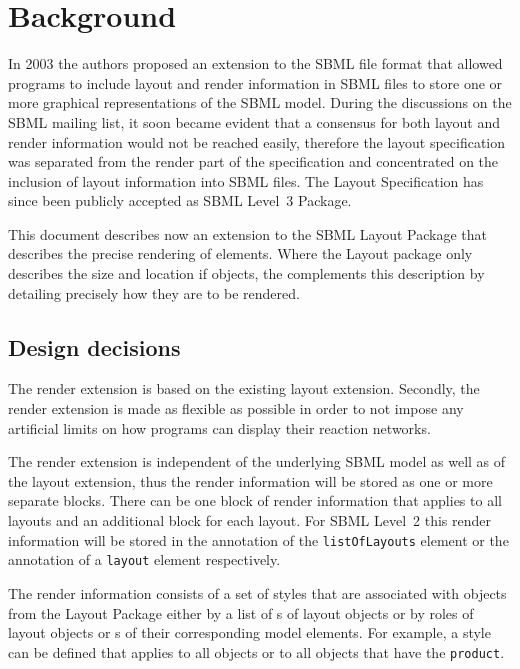 
\section{Background}
\label{background}

In 2003 the authors proposed an extension to the SBML file format that allowed programs 
to include layout and render information in SBML files to store one or more 
graphical representations of the SBML model. During the discussions on the
SBML mailing list, it soon became evident that a consensus for both layout and render 
information would not be reached easily, therefore the layout specification was 
separated from the render part of the specification and concentrated on the inclusion of 
layout information into SBML files. The Layout Specification has since been publicly 
accepted as SBML Level~3 Package. 

This document describes now an extension to the SBML Layout Package that describes 
the precise rendering of elements. Where the Layout package only describes the size and 
location if objects, the \RenderPackage complements this description by detailing 
precisely how they are to be rendered. 

\subsection{Design decisions}

The render extension is based on the existing layout extension. Secondly, the render extension 
is made as flexible as possible in order to not impose any artificial limits on how 
programs can display their reaction networks.

The render extension is independent of the underlying SBML model as well as of the layout extension, 
thus the render information will be stored as one or more separate blocks. There can be one 
block of render information that applies to all layouts and an additional block for each 
layout. For SBML Level~2 this render information will be stored in the annotation of the 
\texttt{listOfLayouts} element or the annotation of a \texttt{layout} element 
respectively.

The render information consists of a set of styles that are associated with 
objects from the Layout Package either by a list of s of layout objects or 
by roles of layout objects or s of their corresponding model elements. For example, 
a style can be defined that applies to all \SpeciesReference 
objects or to all objects that have the  \texttt{product}. 

